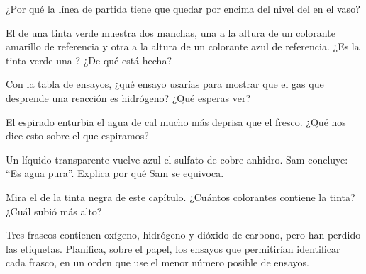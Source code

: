 \begin{exercise}[$\star\star$]\label{exo:g7:identifying-substances:5}
¿Por qué la línea de partida tiene que quedar por encima del nivel del
 en el vaso?
\end{exercise}

\begin{exercise}[$\star\star$]\label{exo:g7:identifying-substances:6}
El  de una tinta verde muestra dos manchas, una a la altura
de un colorante amarillo de referencia y otra a la altura de un
colorante azul de referencia. ¿Es la tinta verde una ? ¿De
qué está hecha?
\end{exercise}

\begin{exercise}[$\star\star$]\label{exo:g7:identifying-substances:7}
Con la tabla de ensayos, ¿qué ensayo usarías para mostrar que el gas
que desprende una reacción es hidrógeno? ¿Qué esperas ver?
\end{exercise}

\begin{exercise}[$\star\star$]\label{exo:g7:identifying-substances:8}
El  espirado enturbia el agua de cal mucho más deprisa que el 
fresco. ¿Qué nos dice esto sobre el  que espiramos?
\end{exercise}

\begin{exercise}[$\star\star$]\label{exo:g7:identifying-substances:9}
Un líquido transparente vuelve azul el sulfato de cobre anhidro. Sam
concluye: ``Es agua pura''. Explica por qué Sam se equivoca.
\end{exercise}

\begin{exercise}[$\star\star$]\label{exo:g7:identifying-substances:10}
Mira el  de la tinta negra de este capítulo. ¿Cuántos
colorantes contiene la tinta? ¿Cuál subió más alto?
\end{exercise}

\begin{exercise}[$\star\star\star$]\label{exo:g7:identifying-substances:11}
Tres frascos contienen oxígeno, hidrógeno y dióxido de carbono, pero han
perdido las etiquetas. Planifica, sobre el papel, los ensayos que
permitirían identificar cada frasco, en un orden que use el menor número
posible de ensayos.
\end{exercise}


